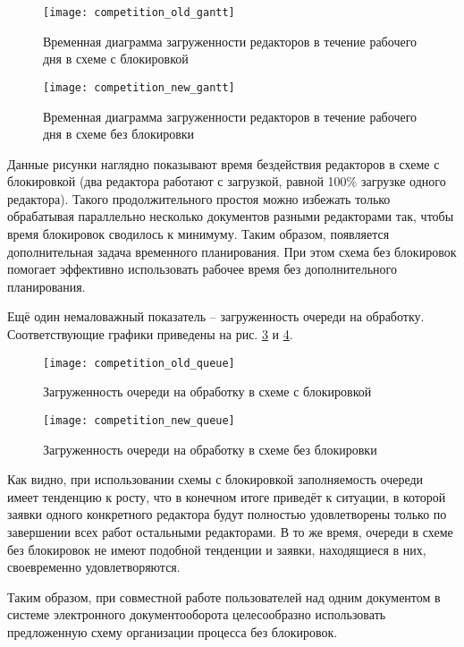 \begin{figure}[h!]
  \centering
  \texttt{[image: competition\_old\_gantt]}
  \caption{Временная диаграмма загруженности редакторов в течение рабочего дня в схеме с блокировкой}
  \label{img:competition_old_gantt}
\end{figure}

\begin{figure}[h!]
  \centering
  \texttt{[image: competition\_new\_gantt]}
  \caption{Временная диаграмма загруженности редакторов в течение рабочего дня в схеме без блокировки}
  \label{img:competition_new_gantt}
\end{figure}

\vspace{\baselineskip}
Данные рисунки наглядно показывают время бездействия редакторов в схеме с блокировкой (два редактора работают с загрузкой, равной 100\% загрузке одного редактора). Такого продолжительного простоя можно избежать только обрабатывая параллельно несколько документов разными редакторами так, чтобы время блокировок сводилось к минимуму. Таким образом, появляется дополнительная задача временн\textit{о}го планирования. При этом схема без блокировок помогает эффективно использовать рабочее время без дополнительного планирования.

\vspace{\baselineskip}
Ещё один немаловажный показатель -- загруженность очереди на обработку. Соответствующие графики приведены на рис. \ref{img:competition_old_queue} и \ref{img:competition_new_queue}.

\begin{figure}[h!]
  \centering
  \texttt{[image: competition\_old\_queue]}
  \caption{Загруженность очереди на обработку в схеме с блокировкой}
  \label{img:competition_old_queue}
\end{figure}

\begin{figure}[h!]
  \centering
  \texttt{[image: competition\_new\_queue]}
  \caption{Загруженность очереди на обработку в схеме без блокировки}
  \label{img:competition_new_queue}
\end{figure}

\vspace{\baselineskip}
Как видно, при использовании схемы с блокировкой заполняемость очереди имеет тенденцию к росту, что в конечном итоге приведёт к ситуации, в которой заявки одного конкретного редактора будут полностью удовлетворены только по завершении всех работ остальными редакторами. В то же время, очереди в схеме без блокировок не имеют подобной тенденции и заявки, находящиеся в них, своевременно удовлетворяются.

\vspace{\baselineskip}
Таким образом, при совместной работе пользователей над одним документом в системе электронного документооборота целесообразно использовать предложенную схему организации процесса без блокировок.